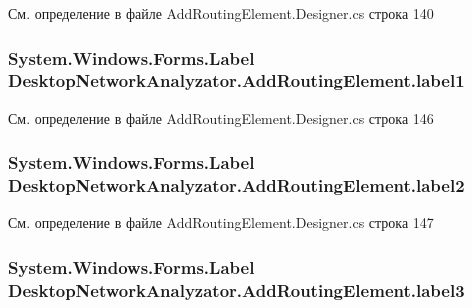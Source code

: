 См. определение в файле Add\+Routing\+Element.\+Designer.\+cs строка 140

\subsubsection[{\texorpdfstring{label1}{label1}}]{\setlength{\rightskip}{0pt plus 5cm}System.\+Windows.\+Forms.\+Label Desktop\+Network\+Analyzator.\+Add\+Routing\+Element.\+label1\hspace{0.3cm}{\ttfamily [private]}}\hypertarget{class_desktop_network_analyzator_1_1_add_routing_element_aae16b705a59cfe2759cd8cda798c0f20}{}\label{class_desktop_network_analyzator_1_1_add_routing_element_aae16b705a59cfe2759cd8cda798c0f20}


См. определение в файле Add\+Routing\+Element.\+Designer.\+cs строка 146

\subsubsection[{\texorpdfstring{label2}{label2}}]{\setlength{\rightskip}{0pt plus 5cm}System.\+Windows.\+Forms.\+Label Desktop\+Network\+Analyzator.\+Add\+Routing\+Element.\+label2\hspace{0.3cm}{\ttfamily [private]}}\hypertarget{class_desktop_network_analyzator_1_1_add_routing_element_ac4aab0134a19193657cf3c881de0b987}{}\label{class_desktop_network_analyzator_1_1_add_routing_element_ac4aab0134a19193657cf3c881de0b987}


См. определение в файле Add\+Routing\+Element.\+Designer.\+cs строка 147

\subsubsection[{\texorpdfstring{label3}{label3}}]{\setlength{\rightskip}{0pt plus 5cm}System.\+Windows.\+Forms.\+Label Desktop\+Network\+Analyzator.\+Add\+Routing\+Element.\+label3\hspace{0.3cm}{\ttfamily [private]}}\hypertarget{class_desktop_network_analyzator_1_1_add_routing_element_a8ab52a205de9c87191fc4051b39787b3}{}\label{class_desktop_network_analyzator_1_1_add_routing_element_a8ab52a205de9c87191fc4051b39787b3}


